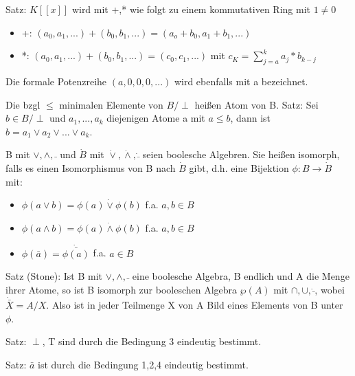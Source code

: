 \documentclass[10pt,landscape]{article}
\begin{document}
\begin{multicols}{3}
Satz: $K[[x]]$ wird mit +,* wie folgt zu einem kommutativen Ring mit $1\not=0$
\begin{itemize}
    \item +: $(a_0,a_1,...) + (b_0,b_1,...) = (a_o+b_0, a_1+b_1, ...)$
    \item *: $(a_0,a_1,...) + (b_0,b_1,...) = (c_0, c_1,...)$ mit $c_K=\sum_{j=a}^{k} a_j*b_{k-j}$
\end{itemize}
Die formale Potenzreihe $(a,0,0,0,...)$ wird ebenfalls mit a bezeichnet.

Die bzgl $\leq$ minimalen Elemente von $B /\perp$ heißen Atom von B.
Satz: Sei $b\in B /\perp$ und $a_1,...,a_k$ diejenigen Atome a mit $a\leq b$, dann ist $b= a_1 \vee a_2 \vee ... \vee a_k$.

B mit $\vee, \wedge, \bar{ }$ und $\dot{B}$ mit $\dot{\vee}, \dot{\wedge}, \dot{\bar{}}$ seien boolesche Algebren. Sie heißen isomorph, falls es einen Isomorphismus von B nach $\dot{B}$ gibt, d.h. eine Bijektion $\phi: B \rightarrow \dot{B}$ mit:
\begin{itemize}
    \item $\phi(a\vee b) =\phi(a)\dot{\vee}\phi(b)$ f.a. $a,b \in B$
    \item $\phi(a\wedge b)=\phi(a)\dot{\wedge}\phi(b)$ f.a. $a,b\in B$
    \item $\phi(\bar{a}) = \dot{\bar{\phi(a)}}$ f.a. $a\in B$
\end{itemize}

Satz (Stone): Ist B mit $\vee, \wedge, \bar{}$ eine boolesche Algebra, B endlich und A die Menge ihrer Atome, so ist B isomorph zur booleschen Algebra $\wp(A)$ mit $\cap,\cup,\dot{\bar{}}$, wobei $\dot{\bar{X}}=A/X$.
Also ist in jeder Teilmenge X von A Bild eines Elements von B unter $\phi$.

Satz: $\perp$, T sind durch die Bedingung 3 eindeutig bestimmt.

Satz: $\bar{a}$ ist durch die Bedingung 1,2,4 eindeutig bestimmt.


\end{multicols}
\end{document}
